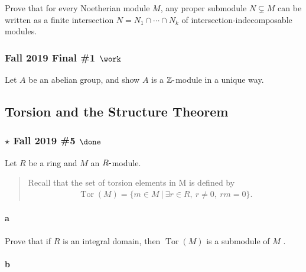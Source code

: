 Prove that for every Noetherian module \(M\), any proper submodule
\(N\subsetneq M\) can be written as a finite intersection
\(N = N_1 \cap\cdots \cap N_k\) of intersection-indecomposable modules.

\hypertarget{fall-2019-final-1-work}{%
\subsubsection{\texorpdfstring{Fall 2019 Final \#1
\(\work\)}{Fall 2019 Final \#1 \textbackslash work}}\label{fall-2019-final-1-work}}

Let \(A\) be an abelian group, and show \(A\) is a
\({\mathbb{Z}}{\hbox{-}}\)module in a unique way.

\hypertarget{torsion-and-the-structure-theorem}{%
\subsection{Torsion and the Structure
Theorem}\label{torsion-and-the-structure-theorem}}

\hypertarget{star-fall-2019-5-done}{%
\subsubsection{\texorpdfstring{\(\star\) Fall 2019 \#5
\(\done\)}{\textbackslash star Fall 2019 \#5 \textbackslash done}}\label{star-fall-2019-5-done}}

Let \(R\) be a ring and \(M\) an \(R{\hbox{-}}\)module.

\begin{quote}
Recall that the set of torsion elements in M is defined by
\begin{align*}
\operatorname{Tor}(M) = \{m \in M {~\mathrel{\Big|}~}\exists r \in R, ~r \neq 0, ~rm = 0\}
.\end{align*}
\end{quote}

\hypertarget{a-88}{%
\paragraph{a}\label{a-88}}

Prove that if \(R\) is an integral domain, then
\(\operatorname{Tor}(M )\) is a submodule of \(M\) .

\hypertarget{b-78}{%
\paragraph{b}\label{b-78}}

